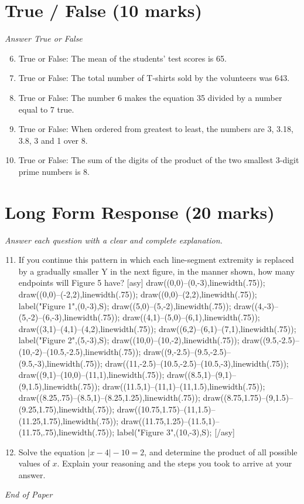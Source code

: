\documentclass[12pt]{article}
\begin{document}
\section*{True / False (10 marks)}
\textit{Answer True or False}
\begin{enumerate}[label=\arabic*.]
\setcounter{enumi}{5}
\item True or False: The mean of the students' test scores is 65.
\item True or False: The total number of T-shirts sold by the volunteers was 643.
\item True or False: The number 6 makes the equation 35 divided by a number equal to 7 true.
\item True or False: When ordered from greatest to least, the numbers are 3, 3.18, 3.8, 3 and 1 over 8.
\item True or False: The sum of the digits of the product of the two smallest 3-digit prime numbers is 8.
\end{enumerate}

\section*{Long Form Response (20 marks)}
\textit{Answer each question with a clear and complete explanation.}
\begin{enumerate}[label=\arabic*.]
\setcounter{enumi}{10}
\item If you continue this pattern in which each line-segment extremity is replaced by a gradually smaller Y in the next figure, in the manner shown, how many endpoints will Figure 5 have? [asy] draw((0,0)--(0,-3),linewidth(.75)); draw((0,0)--(-2,2),linewidth(.75)); draw((0,0)--(2,2),linewidth(.75)); label("Figure 1",(0,-3),S); draw((5,0)--(5,-2),linewidth(.75)); draw((4,-3)--(5,-2)--(6,-3),linewidth(.75)); draw((4,1)--(5,0)--(6,1),linewidth(.75)); draw((3,1)--(4,1)--(4,2),linewidth(.75)); draw((6,2)--(6,1)--(7,1),linewidth(.75)); label("Figure 2",(5,-3),S); draw((10,0)--(10,-2),linewidth(.75)); draw((9.5,-2.5)--(10,-2)--(10.5,-2.5),linewidth(.75)); draw((9,-2.5)--(9.5,-2.5)--(9.5,-3),linewidth(.75)); draw((11,-2.5)--(10.5,-2.5)--(10.5,-3),linewidth(.75)); draw((9,1)--(10,0)--(11,1),linewidth(.75)); draw((8.5,1)--(9,1)--(9,1.5),linewidth(.75)); draw((11.5,1)--(11,1)--(11,1.5),linewidth(.75)); draw((8.25,.75)--(8.5,1)--(8.25,1.25),linewidth(.75)); draw((8.75,1.75)--(9,1.5)--(9.25,1.75),linewidth(.75)); draw((10.75,1.75)--(11,1.5)--(11.25,1.75),linewidth(.75)); draw((11.75,1.25)--(11.5,1)--(11.75,.75),linewidth(.75)); label("Figure 3",(10,-3),S); [/asy]
\item Solve the equation $|x-4| -10 = 2$, and determine the product of all possible values of $x$. Explain your reasoning and the steps you took to arrive at your answer.
\end{enumerate}

\vfill
\noindent\textit{End of Paper}
\end{document}
